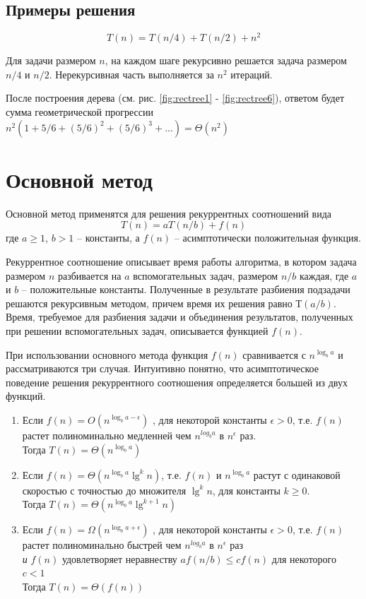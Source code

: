 \documentclass[11pt]{article}
\begin{document}
\subsection{Примеры решения}
\begin{equation*}
  T(n) = T(n/4) + T(n/2) + n^2 
\end{equation*}

Для задачи размером $n$, на каждом шаге рекурсивно решается задача размером $n/4$ и $n/2$. Нерекурсивная часть выполняется за $n^2$ итераций.

После построения дерева (см. рис. \ref{fig:rectree1} - \ref{fig:rectree6}), ответом будет сумма геометрической прогрессии $n^2(1+5/6 + (5/6)^2 + (5/6)^3 + ...) = \Theta(n^2)$

\section{Основной метод}

Основной метод применятся для решения рекуррентных соотношений вида
\begin{equation*}
T(n) = aT(n/b) + f(n)
\end{equation*}
где $a \geqslant 1$, $b > 1$ -- константы, а $f(n)$ -- асимптотически положительная функция.

Рекуррентное соотношение описывает время работы алгоритма, в котором задача размером $n$
разбивается на $a$ вспомогательных задач, размером $n/b$ каждая, где $a$ и $b$ -- положительные константы.
Полученные в результате разбиения подзадачи решаются рекурсивным методом, причем время их решения
равно $Т(a/b)$. Время, требуемое для разбиения задачи и объединения результатов, полученных при
решении вспомогательных задач, описывается функцией $f(n)$.

При использовании основного метода функция $f(n)$ сравнивается с $n^{\log_b a}$ и рассматриваются три случая. Интуитивно понятно, что асимптотическое поведение решения рекуррентного соотношения определяется большей из двух функций.

\begin{enumerate}
\item Если $f(n) = O(n^{\log_{b}{a - \epsilon}})$ , для некоторой константы $\epsilon > 0$, т.е. $f(n)$ растет полиноминально медленней чем $n^{log_b a}$ в $n^\epsilon$ раз.\\
Тогда $T(n) = \Theta(n^{\log_b a})$

\item Если $f(n) = \Theta(n^{\log_b a}\lg^k n)$, т.е. $f(n)$ и $n^{\log_b a}$ растут с одинаковой скоростью с точностью до множителя $\lg^k n$, для константы $k \geqslant 0$.\\
Тогда $T(n) = \Theta(n^{\log_b a}\lg^{k+1} n)$

\item Если $f(n) = \Omega(n^{\log_{b}{a + \epsilon}})$ , для некоторой константы $\epsilon > 0$, т.е. $f(n)$ растет полиноминально быстрей чем $n^{log_b a}$ в $n^\epsilon$ раз \\
\emph{и} $f(n)$ удовлетворяет неравнеству $a f(n/b) \leqslant c f(n)$ для некоторого $c < 1$\\
Тогда $T(n) = \Theta(f(n))$
\end{enumerate}
\end{document}
